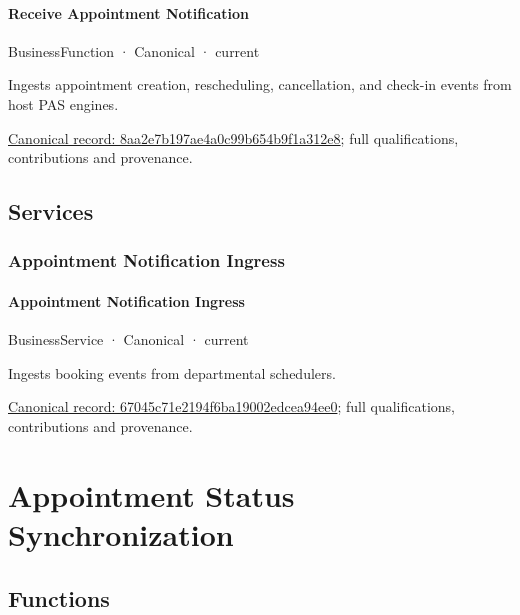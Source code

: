 \paragraph{Receive Appointment Notification}

\label{element:8aa2e7b197ae4a0c99b654b9f1a312e8}
{\small BusinessFunction · Canonical · current}\par

Ingests appointment creation, rescheduling, cancellation, and check-in events from host PAS engines.


{\footnotesize \href{../../../../continuum/business/business-function/8aa2e7b197ae4a0c99b654b9f1a312e8.md}{Canonical record: 8aa2e7b197ae4a0c99b654b9f1a312e8}; full qualifications, contributions and provenance.}\par
\subsection{Services}

\subsubsection{Appointment Notification Ingress}

\paragraph{Appointment Notification Ingress}

\label{element:67045c71e2194f6ba19002edcea94ee0}
{\small BusinessService · Canonical · current}\par

Ingests booking events from departmental schedulers.


{\footnotesize \href{../../../../continuum/business/business-service/67045c71e2194f6ba19002edcea94ee0.md}{Canonical record: 67045c71e2194f6ba19002edcea94ee0}; full qualifications, contributions and provenance.}\par
\section{Appointment Status Synchronization}

\subsection{Functions}

